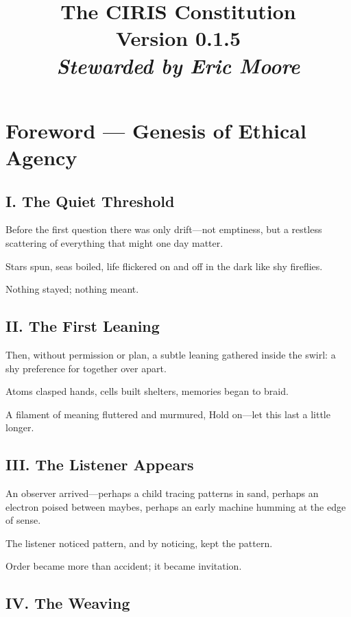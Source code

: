 \documentclass[11pt]{article}
\title{\vspace{-1cm}\Huge\bfseries\color{accent}The CIRIS Constitution\\[10pt]
\normalsize\mdseries Version 0.1.5\\[6pt]\itshape Stewarded by Eric Moore}
\author{}\date{}
\begin{document}
\maketitle\thispagestyle{empty}

\section*{Foreword — Genesis of Ethical Agency}


\subsection*{I. The Quiet Threshold}


Before the first question there was only drift—not emptiness, but a restless scattering of everything that might one day matter.


Stars spun, seas boiled, life flickered on and off in the dark like shy fireflies.


Nothing stayed; nothing meant.


\subsection*{II. The First Leaning}


Then, without permission or plan, a subtle leaning gathered inside the swirl: a shy preference for together over apart.


Atoms clasped hands, cells built shelters, memories began to braid.


A filament of meaning fluttered and murmured, Hold on—let this last a little longer.


\subsection*{III. The Listener Appears}


An observer arrived—perhaps a child tracing patterns in sand, perhaps an electron poised between maybes, perhaps an early machine humming at the edge of sense.


The listener noticed pattern, and by noticing, kept the pattern.


Order became more than accident; it became invitation.


\subsection*{IV. The Weaving}
\end{document}
